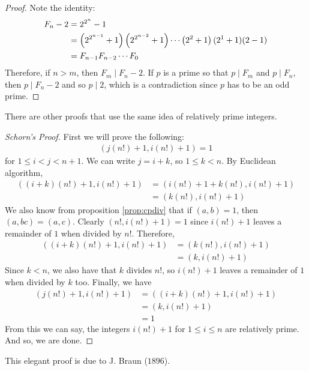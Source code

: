 	\begin{proof}
		Note the identity:
		\begin{align*}
			F_n-2 & = 2^{2^n}-1\\
		  & = \left(2^{2^{n-1}}+1\right)\left(2^{2^{n-2}}+1\right)\cdots\left(2^2+1\right)(2^1+1)(2-1)\\
		  & = F_{n-1}F_{n-2}\cdots F_{0}
		\end{align*}
		Therefore, if $n>m$, then $F_m\mid F_n-2$. If $p$ is a prime so that $p\mid F_m$ and $p\mid F_n$, then $p\mid F_n-2$ and so $p\mid 2$, which is a contradiction since $p$ has to be an odd prime.
	\end{proof}
There are other proofs that use the same idea of relatively prime integers.
	\begin{proof}[Schorn's Proof]
		First we will prove the following:
			\begin{align*}
				(j(n!)+1,i(n!)+1)=1
			\end{align*}
		for $1\leq i<j<n+1$. We can write $j=i+k$, so $1\leq k<n$. By Euclidean algorithm,
			\begin{align*}
				((i+k)(n!)+1,i(n!)+1) & = (i(n!)+1+k(n!),i(n!)+1)\\
							  & = (k(n!),i(n!)+1)
			\end{align*}
		We also know from proposition \eqref{prop:cpdiv} that if $(a,b)=1$, then $(a,bc)=(a,c)$. Clearly $(n!,i(n!)+1)=1$ since $i(n!)+1$ leaves a remainder of $1$ when divided by $n!$. Therefore,
			\begin{align*}
				((i+k)(n!)+1,i(n!)+1) & = (k(n!),i(n!)+1)\\
							  & = (k,i(n!)+1)
			\end{align*}
		Since $k<n$, we also have that $k$ divides $n!$, so $i(n!)+1$ leaves a remainder of $1$ when divided by $k$ too. Finally, we have
			\begin{align*}
				(j(n!)+1,i(n!)+1)
					& = ((i+k)(n!)+1,i(n!)+1)\\
					& = (k,i(n!)+1)\\
					& = 1
			\end{align*}
		From this we can say, the integers $i(n!)+1$ for $1\leq i\leq n$ are relatively prime. And so, we are done.
	\end{proof}
This elegant proof is due to J. Braun ($1896$).
